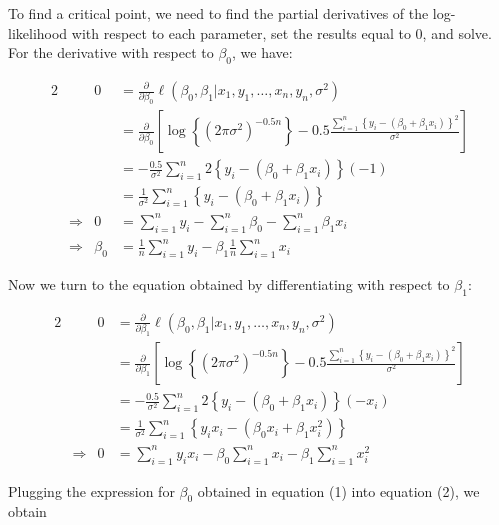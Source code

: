 \documentclass[]{article}
\begin{document}
To find a critical point, we need to find the partial derivatives of the
log-likelihood with respect to each parameter, set the results equal to
0, and solve. For the derivative with respect to \(\beta_0\), we have:

\begin{alignat}{2}
& & 0 &= \frac{\partial}{\partial \beta_0} \ell(\beta_0, \beta_1 | x_1, y_1, \ldots, x_n, y_n, \sigma^2) \nonumber \\
& & &= \frac{\partial}{\partial \beta_0} \left[ \log\left\{  (2 \pi \sigma^2)^{-0.5n}\right\} -0.5 \frac{\sum_{i = 1}^n\left\{y_i - (\beta_0 + \beta_1 x_i)\right\}^2}{\sigma^2} \right] \nonumber \\
& & &= -\frac{0.5}{\sigma^2} \sum_{i = 1}^n 2\left\{y_i - (\beta_0 + \beta_1 x_i)\right\} (-1) \nonumber \\
& & &= \frac{1}{\sigma^2} \sum_{i = 1}^n \left\{y_i - (\beta_0 + \beta_1 x_i)\right\} \nonumber \\
&\Rightarrow & 0 &= \sum_{i = 1}^n y_i - \sum_{i = 1}^n\beta_0 - \sum_{i = 1}^n\beta_1 x_i \nonumber \\
&\Rightarrow & \beta_0 &= \frac{1}{n}\sum_{i = 1}^n y_i - \beta_1 \frac{1}{n} \sum_{i = 1}^n x_i
\end{alignat}

Now we turn to the equation obtained by differentiating with respect to
\(\beta_1\):

\begin{alignat}{2}
& & 0 &= \frac{\partial}{\partial \beta_1} \ell(\beta_0, \beta_1 | x_1, y_1, \ldots, x_n, y_n, \sigma^2) \nonumber \\
& & &= \frac{\partial}{\partial \beta_1} \left[ \log\left\{  (2 \pi \sigma^2)^{-0.5n}\right\} -0.5 \frac{\sum_{i = 1}^n\left\{y_i - (\beta_0 + \beta_1 x_i)\right\}^2}{\sigma^2} \right] \nonumber \\
& & &= -\frac{0.5}{\sigma^2} \sum_{i = 1}^n 2\left\{y_i - (\beta_0 + \beta_1 x_i)\right\} (-x_i) \nonumber \\
& & &= \frac{1}{\sigma^2} \sum_{i = 1}^n \left\{y_i x_i - (\beta_0 x_i + \beta_1 x_i^2)\right\} \nonumber \\
&\Rightarrow & 0 &= \sum_{i = 1}^n y_i x_i - \beta_0 \sum_{i = 1}^n x_i - \beta_1 \sum_{i = 1}^n x_i^2
\end{alignat}

Plugging the expression for \(\beta_0\) obtained in equation (1) into
equation (2), we obtain
\end{document}
